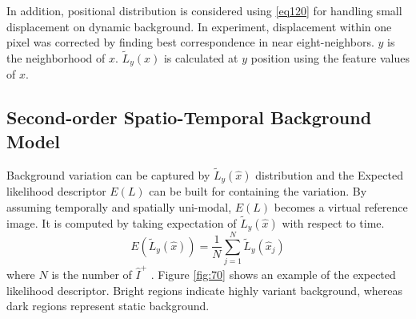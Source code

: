 \documentclass[conference]{IEEEtran}
\begin{document}
In addition, positional distribution is considered using  \ref{eq120} for handling small displacement on dynamic background. In experiment, displacement within one pixel was corrected by finding best correspondence in near eight-neighbors. \begin{math} y \end{math} is the neighborhood of \begin{math} x \end{math}. \begin{math} \tilde{L}_y(x) \end{math}  is calculated at \begin{math} y \end{math} position using the feature values of \begin{math} x \end{math}.


\subsection{Second-order Spatio-Temporal Background Model}
Background variation can be captured by \begin{math} \tilde{L}_y(\hat{x}) \end{math}  distribution and the Expected likelihood descriptor \begin{math} E(L) \end{math} can be built for containing the variation. By assuming temporally and spatially uni-modal, \begin{math} E(L) \end{math} becomes a virtual reference image. It is computed by taking expectation of \begin{math} \tilde{L}_y(\hat{x}) \end{math} with respect to time. 
\begin{equation}\label{eq:130}
  E(\tilde{L}_y(\hat{x})) = \frac{1}{N} \sum_{j=1}^N \tilde{L}_y(\hat{x}_j)
\end{equation}
where \begin{math} N \end{math} is the number of \begin{math} \hat{I}^+ \end{math} . Figure \ref{fig:70} shows an example of the expected likelihood descriptor. Bright regions indicate highly variant background, whereas dark regions represent static background.
\end{document}
